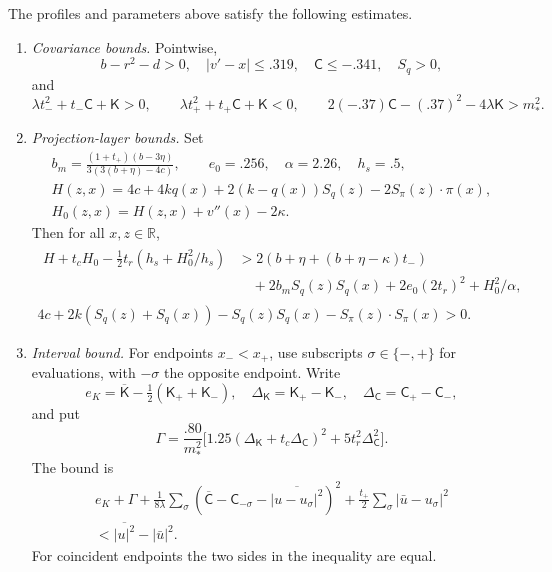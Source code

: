 \begin{proposition}\label{prop:scalar-input}
The profiles and parameters above satisfy the following estimates.
\begin{enumerate}
\item \emph{Covariance bounds.} Pointwise,
\[
 b-r^2-d>0,\quad |v'-x|\le .319,\quad \mathsf C\le-.341,\quad S_q>0,
\]
and
\[
 \lambda t_-^2+t_-\mathsf C+\mathsf K>0,\qquad
 \lambda t_+^2+t_+\mathsf C+\mathsf K<0,\qquad
 2(-.37)\mathsf C-(.37)^2-4\lambda\mathsf K>m_*^2 .
\]
\item \emph{Projection-layer bounds.} Set
\[
 \begin{gathered}
 b_m=\frac{(1+t_+)(b-3\eta)}{3(3(b+\eta)-4c)},\qquad
 e_0=.256,\quad \alpha=2.26,\quad h_s=.5,\\
 H(z,x)=4c+4kq(x)+2(k-q(x))S_q(z)-2S_\pi(z)\cdot\pi(x),\\
 H_0(z,x)=H(z,x)+v''(x)-2\kappa .
 \end{gathered}
\]
Then for all $x,z\in\mathbb R$,
\begin{equation}
\begin{gathered}
 \begin{aligned}
 H+t_c H_0-\tfrac12t_r(h_s+H_0^2/h_s)
 &>2(b+\eta+(b+\eta-\kappa)t_-)\\
 &\quad+2 b_m S_q(z)S_q(x)+2e_0(2t_r)^2+H_0^2/\alpha,
 \end{aligned}\\
 4c+2k(S_q(z)+S_q(x))-S_q(z)S_q(x)-S_\pi(z)\cdot S_\pi(x)>0 .
\end{gathered}\label{eq:pointwise-layer-inequalities}
\end{equation}
\item \emph{Interval bound.} For endpoints $x_-<x_+$, use subscripts $\sigma\in\{-,+\}$ for evaluations, with $-\sigma$ the opposite endpoint. Write
\[
 e_K=\overline{\mathsf K}-\tfrac12(\mathsf K_++\mathsf K_-),
 \quad
 \Delta_{\mathsf K}=\mathsf K_+-\mathsf K_-,
 \quad
 \Delta_{\mathsf C}=\mathsf C_+-\mathsf C_-,
\]
and put
\[
 \Gamma=\frac{.80}{m_*^2}
 \big[1.25(\Delta_{\mathsf K}+t_c\Delta_{\mathsf C})^2+
                  5t_r^2\Delta_{\mathsf C}^2\big].
\]
The bound is
\begin{equation}
\begin{split}
 e_K+\Gamma
 +\frac{1}{8\lambda}\sum_\sigma
 (\overline{\mathsf C}-\mathsf C_{-\sigma}-\overline{|u-u_\sigma|^2})^2
 +\frac{t_+}{2}\sum_\sigma|\bar u-u_\sigma|^2\\
 < \overline{|u|^2}-|\bar u|^2 .
\end{split}\label{eq:interval-penalty}
\end{equation}
For coincident endpoints the two sides in the inequality are equal.
\end{enumerate}
\end{proposition}

